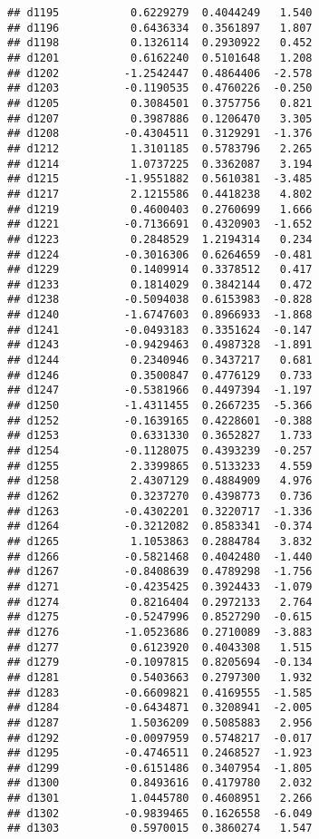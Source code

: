 \documentclass[
]{article}
\begin{document}
\begin{verbatim}
## d1195           0.6229279  0.4044249   1.540
## d1196           0.6436334  0.3561897   1.807
## d1198           0.1326114  0.2930922   0.452
## d1201           0.6162240  0.5101648   1.208
## d1202          -1.2542447  0.4864406  -2.578
## d1203          -0.1190535  0.4760226  -0.250
## d1205           0.3084501  0.3757756   0.821
## d1207           0.3987886  0.1206470   3.305
## d1208          -0.4304511  0.3129291  -1.376
## d1212           1.3101185  0.5783796   2.265
## d1214           1.0737225  0.3362087   3.194
## d1215          -1.9551882  0.5610381  -3.485
## d1217           2.1215586  0.4418238   4.802
## d1219           0.4600403  0.2760699   1.666
## d1221          -0.7136691  0.4320903  -1.652
## d1223           0.2848529  1.2194314   0.234
## d1224          -0.3016306  0.6264659  -0.481
## d1229           0.1409914  0.3378512   0.417
## d1233           0.1814029  0.3842144   0.472
## d1238          -0.5094038  0.6153983  -0.828
## d1240          -1.6747603  0.8966933  -1.868
## d1241          -0.0493183  0.3351624  -0.147
## d1243          -0.9429463  0.4987328  -1.891
## d1244           0.2340946  0.3437217   0.681
## d1246           0.3500847  0.4776129   0.733
## d1247          -0.5381966  0.4497394  -1.197
## d1250          -1.4311455  0.2667235  -5.366
## d1252          -0.1639165  0.4228601  -0.388
## d1253           0.6331330  0.3652827   1.733
## d1254          -0.1128075  0.4393239  -0.257
## d1255           2.3399865  0.5133233   4.559
## d1258           2.4307129  0.4884909   4.976
## d1262           0.3237270  0.4398773   0.736
## d1263          -0.4302201  0.3220717  -1.336
## d1264          -0.3212082  0.8583341  -0.374
## d1265           1.1053863  0.2884784   3.832
## d1266          -0.5821468  0.4042480  -1.440
## d1267          -0.8408639  0.4789298  -1.756
## d1271          -0.4235425  0.3924433  -1.079
## d1274           0.8216404  0.2972133   2.764
## d1275          -0.5247996  0.8527290  -0.615
## d1276          -1.0523686  0.2710089  -3.883
## d1277           0.6123920  0.4043308   1.515
## d1279          -0.1097815  0.8205694  -0.134
## d1281           0.5403663  0.2797300   1.932
## d1283          -0.6609821  0.4169555  -1.585
## d1284          -0.6434871  0.3208941  -2.005
## d1287           1.5036209  0.5085883   2.956
## d1292          -0.0097959  0.5748217  -0.017
## d1295          -0.4746511  0.2468527  -1.923
## d1299          -0.6151486  0.3407954  -1.805
## d1300           0.8493616  0.4179780   2.032
## d1301           1.0445780  0.4608951   2.266
## d1302          -0.9839465  0.1626558  -6.049
## d1303           0.5970015  0.3860274   1.547

\end{verbatim}
\end{document}
